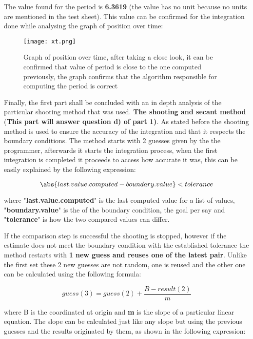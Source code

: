 \documentclass[letterpaper,12pt]{article}
\begin{document}
\newpage
\indent
The value found for the period is \textbf{6.3619} (the value has no unit because no units are mentioned in the test sheet). This value can be confirmed for the integration done while analysing the graph of position over time:

\begin{figure}[h]
  \centering
    \texttt{[image: xt.png]}     
    \caption{Graph of position over time, after taking a close look, it can be confirmed that value of period is close to the one computed previously, the graph confirms that the algorithm responsible for computing the period is correct}
\end{figure} 

\indent
Finally, the first part shall be concluded with an in depth analysis of the particular shooting method that was used. \textbf{The shooting and secant method} (\textbf{This part will answer question d) of part 1)}. As stated before the shooting method is used to ensure the accuracy of the integration and that it respects the boundary conditions. The method starts with 2 guesses given by the the programmer, afterwards it starts the integration process, when the first integration is completed it proceeds to access how accurate it was, this can be easily explained by the following expression:

\begin{equation*}
\abs{last.value.computed - boundary.value}<tolerance
\end{equation*}

where "\textbf{last.value.computed}" is the last computed value for a list of values, "\textbf{boundary.value}" is the of the boundary condition, the goal per say and "\textbf{tolerance}" is how the two compared values can differ.

\indent 
If the comparison step is successful the shooting is stopped, however if the estimate does not meet the boundary condition with the established tolerance the method restarts with \textbf{1 new guess and reuses one of the latest pair}. Unlike the first set these 2 new guesses are not random, one is reused and the other one can be calculated using the following formula:

   
\begin{equation*}
guess(3)=guess(2)+\frac{B-result(2)}{m}
\end{equation*}

\newpage
where B is the coordinated at origin and \textbf{m} is the slope of a particular linear equation. The slope can be calculated just like any slope but using the previous guesses and the results originated by them, as shown in the following expression:
\end{document}
